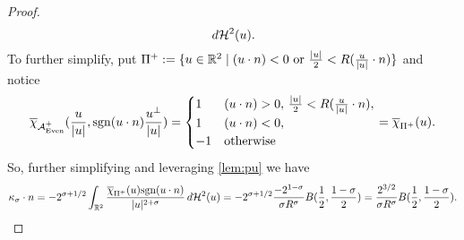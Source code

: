 \documentclass{article}
\newcommand{\haus}[2]{\mathcal{H}^{#1}\parens{#2}}
\newcommand{\R}[1]{\mathbb{R}^{#1}}
\newcommand{\optparens}[1]{\ifthenelse{\equal{#1}{}}{}{\parens{#1}}}
\newcommand{\chit}[2]{\overline{\chi}_{#1}\optparens{#2}}
\newcommand{\A}{\mathcal{A}^{+}}
\newcommand{\Ae}{\A_{\textup{Even}}}
\newcommand{\ks}{\kappa_\sigma}
\newcommand{\B}[1]{B\parens{#1}}
\newcommand{\sgn}[1]{\mathrm{sgn}\parens{#1}}
\newcommand{\Pu}{\Pi^+}
\renewcommand{\dot}[2]{{#1}\cdot{#2}}
\newcommand{\pdot}[2]{\parens{\dot{#1}{#2}}}
\begin{document}
\begin{proof}
$$    \, d\haus{2}{u}.
  $$
  To further simplify, put $\Pu := \braces{u \in \R{2} \mid \pdot{u}{n} < 0 \textup{ or } \frac{\abs{u}}{2} < R\pdot{\frac{u}{\abs{u}}}{n}}$ and notice
  $$
  \chit{\Ae}{\frac{u}{\abs{u}}, \sgn{\dot{u}{n}} \frac{u^\perp}{\abs{u}}} =
  \begin{cases}
    1 & \pdot{u}{n} > 0, \, \frac{\abs{u}}{2} < R \pdot{\frac{u}{\abs{u}}}{n}, \\
    1 & \pdot{u}{n} < 0, \\
    -1 & \textup{otherwise}
  \end{cases} = \chit{\Pu}{u}.
  $$
  So, further simplifying and leveraging \ref{lem:pu} we have
  $$
  \dot{\ks}{n} = -2^{\sigma+1/2}\int_{\R{2}} \frac{\chit{\Pu}{u}\sgn{\dot{u}{n}}}{\abs{u}^{2+\sigma}} \, d\haus{2}{u} = -2^{\sigma+1/2} \frac{-2^{1-\sigma}}{\sigma R^{\sigma}} \B{\frac{1}{2},\frac{1-\sigma}{2}} = \frac{2^{3/2}}{\sigma R^\sigma} \B{\frac{1}{2}, \frac{1-\sigma}{2}}.
  $$

\end{proof}
\end{document}
